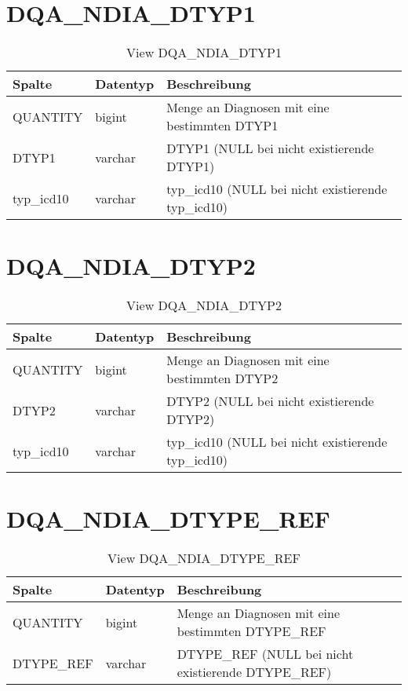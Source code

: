   \section{DQA\_NDIA\_DTYP1}

  \begin{table}[ht]
    \centering
    \caption{View DQA\_NDIA\_DTYP1}
    \label{tab:dqandiadtyp1}
    \begin{tabular}{||l|l|p{10cm}||}
      \hline
      Spalte & Datentyp & Beschreibung \\ [0.5ex] \hline \hline
QUANTITY & bigint & Menge an Diagnosen mit eine bestimmten DTYP1 \\ \hline
DTYP1 & varchar & DTYP1 (NULL bei nicht existierende DTYP1)\\ \hline
typ\_icd10 & varchar & typ\_icd10 (NULL bei nicht existierende typ\_icd10)\\ \hline
    \end{tabular}
  \end{table}
 \clearpage
  \section{DQA\_NDIA\_DTYP2}

  \begin{table}[ht]
    \centering
    \caption{View DQA\_NDIA\_DTYP2}
    \label{tab:dqandiadtyp2}
    \begin{tabular}{||l|l|p{10cm}||}
      \hline
      Spalte & Datentyp & Beschreibung \\ [0.5ex] \hline \hline
QUANTITY & bigint & Menge an Diagnosen mit eine bestimmten DTYP2 \\ \hline
DTYP2 & varchar & DTYP2 (NULL bei nicht existierende DTYP2)\\ \hline
typ\_icd10 & varchar & typ\_icd10 (NULL bei nicht existierende typ\_icd10)\\ \hline
    \end{tabular}
  \end{table}
 \clearpage
  \section{DQA\_NDIA\_DTYPE\_REF}

  \begin{table}[ht]
    \centering
    \caption{View DQA\_NDIA\_DTYPE\_REF}
    \label{tab:dqandiadtyperef}
    \begin{tabular}{||l|l|p{10cm}||}
      \hline
      Spalte & Datentyp & Beschreibung \\ [0.5ex] \hline \hline
QUANTITY & bigint & Menge an Diagnosen mit eine bestimmten DTYPE\_REF \\ \hline
DTYPE\_REF & varchar & DTYPE\_REF (NULL bei nicht existierende DTYPE\_REF)\\ \hline
    \end{tabular}
  \end{table}
 \clearpage

